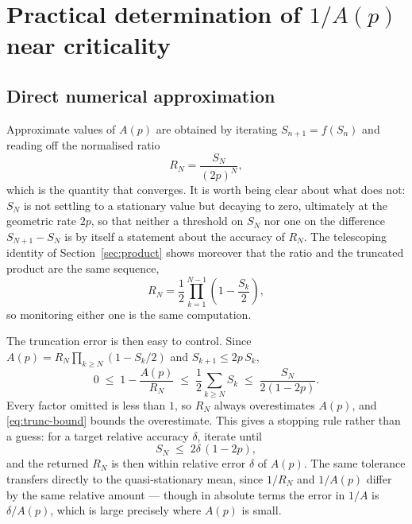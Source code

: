 \section{Practical determination of \texorpdfstring{$1/A(p)$}{1/A(p)} near criticality}

\subsection{Direct numerical approximation}

Approximate values of $A(p)$ are obtained by iterating $S_{n+1}=f(S_n)$ and reading
off the normalised ratio
\begin{equation}
R_N=\frac{S_N}{(2p)^N},
\label{eq:ratiomonitor}
\end{equation}
which is the quantity that converges. It is worth being clear about what does not:
$S_N$ is not settling to a stationary value but decaying to zero, ultimately at the
geometric rate $2p$, so that neither a threshold on $S_N$ nor one on the difference
$S_{N+1}-S_N$ is by itself a statement about the accuracy of $R_N$. The telescoping identity of
Section~\ref{sec:product} shows moreover that the ratio and the truncated product
are the same sequence,
\[
R_N=\frac{1}{2}\prod_{k=1}^{N-1}\left(1-\frac{S_k}{2}\right),
\]
so monitoring either one is the same computation.

The truncation error is then easy to control. Since $A(p)=R_N\prod_{k\ge N}(1-S_k/2)$
and $S_{k+1}\le 2p\,S_k$,
\begin{equation}
0\;\le\;1-\frac{A(p)}{R_N}\;\le\;\frac{1}{2}\sum_{k\ge N}S_k\;\le\;\frac{S_N}{2(1-2p)} .
\label{eq:trunc-bound}
\end{equation}
Every factor omitted is less than $1$, so $R_N$ always overestimates $A(p)$, and
\eqref{eq:trunc-bound} bounds the overestimate. This gives a stopping rule rather
than a guess: for a target relative accuracy $\delta$, iterate until
\begin{equation}
S_N\;\le\;2\delta\,(1-2p),
\label{eq:stoprule}
\end{equation}
and the returned $R_N$ is then within relative error $\delta$ of $A(p)$. The same
tolerance transfers directly to the quasi-stationary mean, since $1/R_N$ and
$1/A(p)$ differ by the same relative amount --- though in absolute terms the error
in $1/A$ is $\delta/A(p)$, which is large precisely where $A(p)$ is small.

